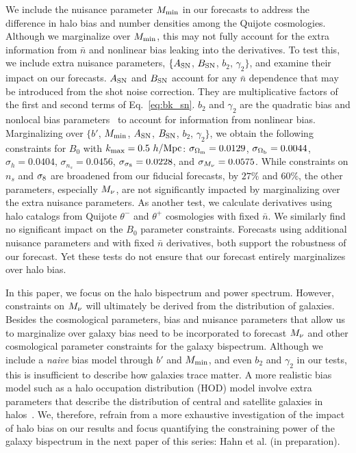 We include the nuisance parameter $M_{\rm min}$ in our forecasts to address the 
difference in halo bias and number densities among the Quijote cosmologies. Although 
we marginalize over $M_{\rm min}$, this may not fully account for the extra 
information from $\bar{n}$ and nonlinear bias leaking into the derivatives. 
To test this, we include extra nuisance parameters, $\{A_{\rm SN}$, 
$B_{\rm SN}$, $b_2$, $\gamma_2\}$, and examine their impact on our forecasts. 
$A_{\rm SN}$ and $B_{\rm SN}$ account for any $\bar{n}$ dependence that may 
be introduced from the shot noise correction. They are multiplicative factors 
of the first and second terms of Eq.~\ref{eq:bk_sn}. $b_2$ and $\gamma_2$ 
are the quadratic bias and nonlocal bias parameters~\citep{chan2012, sheth2013}
to account for information from nonlinear bias. Marginalizing over $\{b'$, 
$M_{\rm min}$, $A_{\rm SN}$, $B_{\rm SN}$, $b_2$, $\gamma_2\}$, we obtain the 
following constraints for $B_0$ with $k_{\rm max} = 0.5~h/{\rm Mpc}$:
$\sigma_{\Omega_{\rm m}} = 0.0129$, $\sigma_{\Omega_{\rm b}} = 0.0044$, $\sigma_h=0.0404$, 
$\sigma_{n_s}=0.0456$, $\sigma_{\sigma_8}=0.0228$, and $\sigma_{M_\nu}=0.0575$. 
While constraints on $n_s$ and $\sigma_8$ are broadened from our fiducial 
forecasts, by $27\%$ and $60\%$, the other parameters, especially $M_\nu$, 
are not significantly impacted by marginalizing over the extra nuisance 
parameters. As another test, we calculate derivatives using halo catalogs 
from Quijote $\theta^{-}$ and $\theta^{+}$ cosmologies with fixed $\bar{n}$. 
We similarly find no significant impact on the $B_0$ parameter constraints.
Forecasts using additional nuisance parameters and with fixed $\bar{n}$ 
derivatives, both support the robustness of our forecast. Yet these 
tests do not ensure that our forecast entirely marginalizes over halo bias. 

In this paper, we focus on the halo bispectrum and power spectrum. However,   
constraints on $M_\nu$ will ultimately be derived from the distribution of 
galaxies. Besides the cosmological parameters, bias and nuisance parameters 
that allow us to marginalize over galaxy bias need to be incorporated to 
forecast $M_\nu$ and other cosmological parameter constraints for the 
galaxy bispectrum. Although we include a \emph{naive} bias model through $b'$ 
and $M_{\rm min}$, and even $b_2$ and $\gamma_2$ in our tests, this is 
insufficient to describe how galaxies trace matter. A more realistic bias model 
such as a halo occupation distribution (HOD) model involve extra parameters 
that describe the distribution of central and satellite galaxies in 
halos~\citep[\emph{e.g.}][]{zheng2005,leauthaud2012,tinker2013,zentner2016,vakili2019}. 
We, therefore, refrain from a more exhaustive investigation of the impact of 
halo bias on our results and focus quantifying the constraining power of 
the galaxy bispectrum in the next paper of this series: Hahn et al. (in preparation). 

